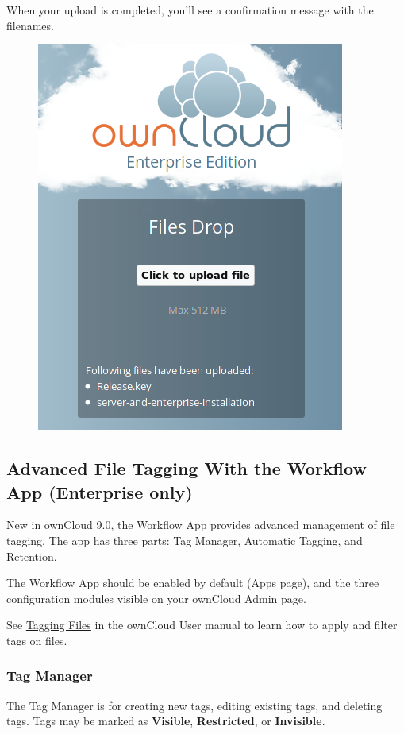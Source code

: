 \documentclass[letterpaper,10pt,english]{sphinxmanual}
\begin{document}
When your upload is completed, you'll see a confirmation message with the
filenames.
\begin{figure}[htbp]
\centering

\includegraphics{files-drop-7.png}
\end{figure}


\subsection{Advanced File Tagging With the Workflow App (Enterprise only)}
\label{enterprise_file_management/files_tagging:advanced-file-tagging-with-the-workflow-app-enterprise-only}\label{enterprise_file_management/files_tagging::doc}
New in ownCloud 9.0, the Workflow App provides advanced management of file
tagging. The app has three parts: Tag Manager, Automatic Tagging, and Retention.

The Workflow App should be enabled by default (Apps page), and the three
configuration modules visible on your ownCloud Admin page.

See \href{https://doc.owncloud.com/server/9.2/user\_manual/files/access\_webgui.html}{Tagging Files} in
the ownCloud User manual to learn how to apply and filter tags on files.


\subsubsection{Tag Manager}
\label{enterprise_file_management/files_tagging:tag-manager}
The Tag Manager is for creating new tags, editing existing tags, and deleting tags. Tags may be marked as \textbf{Visible}, \textbf{Restricted}, or \textbf{Invisible}.
\end{document}
